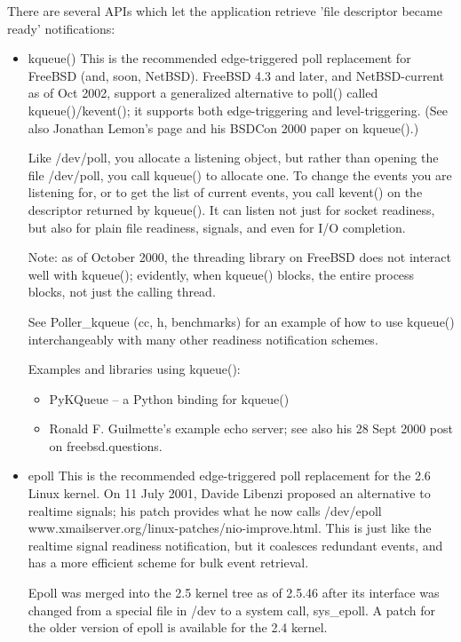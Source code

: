 \documentclass[twoside, xetex]{report}
\begin{document}
There are several APIs which let the application retrieve 'file descriptor became ready' notifications:
\begin{itemize}

	\item kqueue() This is the recommended edge-triggered poll replacement for FreeBSD (and, soon, NetBSD).
FreeBSD 4.3 and later, and NetBSD-current as of Oct 2002, support a generalized alternative to poll() called kqueue()/kevent(); it supports both edge-triggering and level-triggering. (See also Jonathan Lemon's page and his BSDCon 2000 paper on kqueue().)

Like /dev/poll, you allocate a listening object, but rather than opening the file /dev/poll, you call kqueue() to allocate one. To change the events you are listening for, or to get the list of current events, you call kevent() on the descriptor returned by kqueue(). It can listen not just for socket readiness, but also for plain file readiness, signals, and even for I/O completion.

Note: as of October 2000, the threading library on FreeBSD does not interact well with kqueue(); evidently, when kqueue() blocks, the entire process blocks, not just the calling thread.

See Poller\_kqueue (cc, h, benchmarks) for an example of how to use kqueue() interchangeably with many other readiness notification schemes.

Examples and libraries using kqueue():

\begin{itemize}
\item PyKQueue -- a Python binding for kqueue()
\item Ronald F. Guilmette's example echo server; see also his 28 Sept 2000 post on freebsd.questions.
\end{itemize}

\item epoll
This is the recommended edge-triggered poll replacement for the 2.6 Linux kernel.
On 11 July 2001, Davide Libenzi proposed an alternative to realtime signals; his patch provides what he now calls /dev/epoll www.xmailserver.org/linux-patches/nio-improve.html. This is just like the realtime signal readiness notification, but it coalesces redundant events, and has a more efficient scheme for bulk event retrieval.

Epoll was merged into the 2.5 kernel tree as of 2.5.46 after its interface was changed from a special file in /dev to a system call, sys\_epoll. A patch for the older version of epoll is available for the 2.4 kernel.


\end{itemize}
\end{document}
